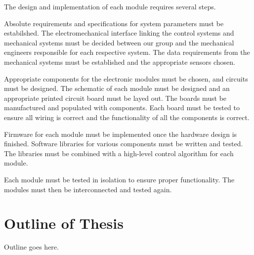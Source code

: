 The design and implementation of each module requires several steps. 

Absolute requirements and specifications for system parameters must be estabilshed. The electromechanical interface linking the control systems and mechanical systems must be decided between our group and the mechanical engineers responsible for each respective system. The data requirements from the mechanical systems must be established and the appropriate sensors chosen.

Appropriate components for the electronic modules must be chosen, and circuits must be designed. The schematic of each module must be designed and an appropriate printed circuit board must be layed out. The boards must be manufactured and populated with components. Each board must be tested to ensure all wiring is correct and the functionality of all the components is correct.

Firmware for each module must be implemented once the hardware design is finished. Software libraries for various components must be written and tested. The libraries must be combined with a high-level control algorithm for each module. 

Each module must be tested in isolation to ensure proper functionality. The modules must then be interconnected and tested again.

\section{Outline of Thesis}

Outline goes here.
